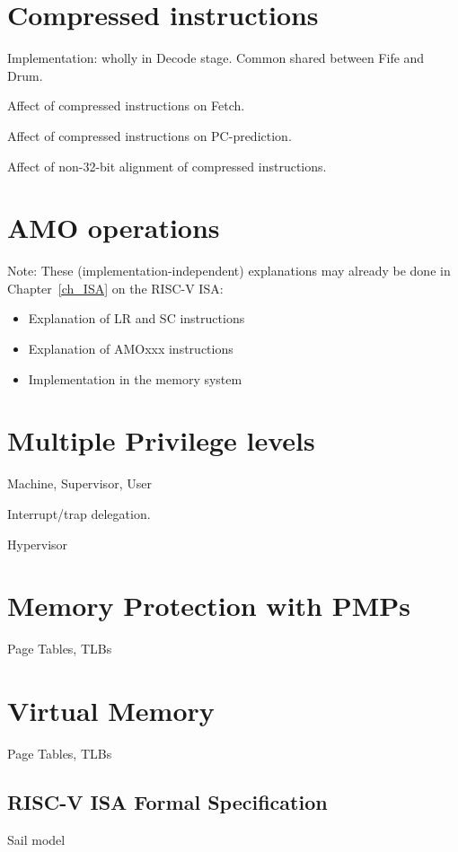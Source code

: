 \section{Compressed instructions}

Implementation: wholly in Decode stage.  Common shared between Fife and Drum.

Affect of compressed instructions on Fetch.

Affect of compressed instructions on PC-prediction.

Affect of non-32-bit alignment of compressed instructions.


\section{AMO operations}

Note: These (implementation-independent) explanations may already be
done in Chapter~\ref{ch_ISA} on the RISC-V ISA:

\begin{itemize}
  \item Explanation of LR and SC instructions
  \item Explanation of AMOxxx instructions
  \item Implementation in the memory system
\end{itemize}


\section{Multiple Privilege levels}

Machine, Supervisor, User

Interrupt/trap delegation.

Hypervisor


\section{Memory Protection with PMPs}

Page Tables, TLBs


\section{Virtual Memory}

Page Tables, TLBs


\subsection{RISC-V ISA Formal Specification}

Sail model


